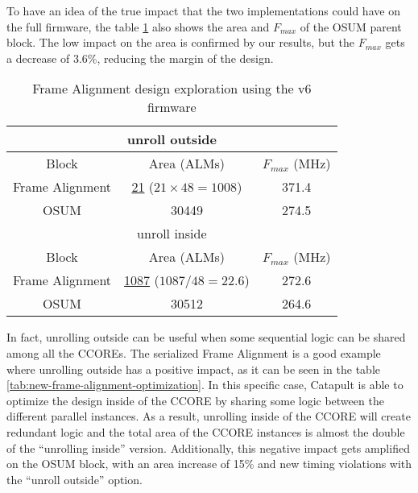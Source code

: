 \begin{itemize}
To have an idea of the true impact that the two implementations could have on the full firmware, the table \ref{tab:frame-alignment-optimization} also shows the area and \(F_{max}\) of the OSUM parent block. The low impact on the area is confirmed by our results, but the \(F_{max}\) gets a decrease of 3.6\%, reducing the margin of the design.

\begin{table}[ht]
    \centering
    \begin{tabular}{|c|c|c|}
        \hline
        \hline
        \multicolumn{3}{|c|}{unroll outside} \\
        \hline
        Block & Area (ALMs) & \(F_{max}\) (MHz) \\
        \hline
        Frame Alignment & \underline{21} (\(21\times48=1008\)) & 371.4 \\
        OSUM & 30449 & 274.5 \\
        \hline
        \hline
        \multicolumn{3}{|c|}{unroll inside} \\
        \hline
        Block & Area (ALMs) & \(F_{max}\) (MHz) \\
        \hline
        Frame Alignment & \underline{1087} (\(1087/48=22.6\))& 272.6\\
        OSUM & 30512 & 264.6\\
        \hline
    \end{tabular}
    \caption{Frame Alignment design exploration using the v6 firmware}
    \label{tab:frame-alignment-optimization}
\end{table}

In fact, unrolling outside can be useful when some sequential logic can be shared among all the CCOREs. The serialized Frame Alignment is a good example where unrolling outside has a positive impact, as it can be seen in the table \ref{tab:new-frame-alignment-optimization}. In this specific case, Catapult is able to optimize the design inside of the CCORE by sharing some logic between the different parallel instances. As a result, unrolling inside of the CCORE will create redundant logic and the total area of the CCORE instances is almost the double of the ``unrolling inside'' version. Additionally, this negative impact gets amplified on the OSUM block, with an area increase of 15\% and new timing violations with the ``unroll outside'' option.


\end{itemize}
